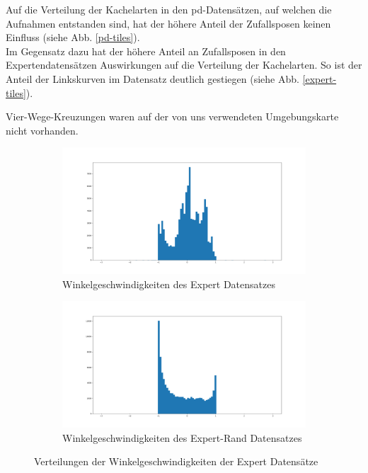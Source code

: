 Auf die Verteilung der Kachelarten in den \acs{pd}-Datensätzen, auf welchen die Aufnahmen entstanden sind, hat der höhere Anteil der Zufallsposen keinen Einfluss (siehe Abb. \ref{pd-tiles}).\\
Im Gegensatz dazu hat der höhere Anteil an Zufallsposen in den Expertendatensätzen Auswirkungen auf die Verteilung der Kachelarten. So ist der Anteil der Linkskurven im Datensatz deutlich gestiegen (siehe Abb. \ref{expert-tiles}).

Vier-Wege-Kreuzungen waren auf der von uns verwendeten Umgebungskarte nicht vorhanden.

\begin{figure}[H]
	\centering
	\begin{subfigure}{0.5\textwidth}
		\centering
		\includegraphics[width=\linewidth]{kapitel4/images/plots/expert-angular_velocities.png}
		\caption{Winkelgeschwindigkeiten des Expert Datensatzes}
		\label{expert-angular}
	\end{subfigure}%
	\begin{subfigure}{0.5\textwidth}
		\centering
		\includegraphics[width=\linewidth]{kapitel4/images/plots/expert-random-angular_velocities.png}
		\caption{Winkelgeschwindigkeiten des Expert-Rand Datensatzes}
		\label{expert-rand-angular}
	\end{subfigure}
	\caption{Verteilungen der Winkelgeschwindigkeiten der Expert Datensätze}
	\label{expert-angles}
\end{figure}


